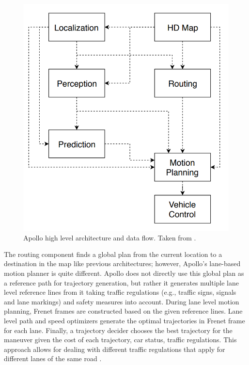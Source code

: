 \begin{figure}[h]
  \centering
  \includegraphics[width=.8\textwidth]{figures/apollo.png}
  \caption{Apollo high level architecture and data flow. Taken from
    \cite{Fan2018BaiduAE}.}
    \label{figure:apollo}
\end{figure}

The routing component finds a global plan from the current location
to a destination in the map like previous architectures; however, Apollo's
lane-based motion planner is quite different. Apollo does not directly use
this global plan as a reference path for trajectory generation, but rather it
generates multiple lane level reference lines from it taking traffic
regulations (e.g., traffic signs, signals and lane markings) and safety
measures into account.  During lane level motion planning, Frenet frames are
constructed based on the given reference lines.  Lane level path and speed
optimizers generate the optimal trajectories in Frenet frame for each lane.
Finally, a trajectory decider chooses the best trajectory for the maneuver
given the cost of each trajectory, car status, traffic regulations.  This
approach allows for dealing with different traffic regulations that apply for
different lanes of the same road \cite{Fan2018BaiduAE}.

